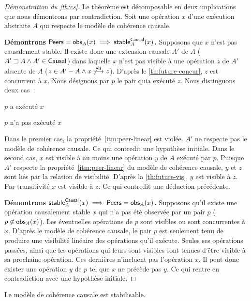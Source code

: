 \begin{proof}[Démonstration du \autoref{th:cs}]
Le théorème est décomposable en deux implications que nous démontrons par contradiction.
Soit une opération $x$ d'une exécution abstraite $A$ qui respecte le modèle de cohérence causale.

\textbf{Démontrons $\operatorname{\mathsf{Peers}} = \operatorname{\mathsf{obs}}_A(x) \implies \operatorname{\mathsf{stable}}_A^{\operatorname{\mathsf{Causal}}}(x)$.}
Supposons que $x$ n'est pas causalement stable.
Il existe donc une extension causale $A'$ de $A$ ($A' \sqsupset A \land A' \in \operatorname{\mathsf{Causal}}$) dans laquelle $x$ n'est pas visible à une opération $z$ de $A'$ absente de $A$ ($z \in A' - A \land x \not\overset{\mathsf{vis}}{\longrightarrow} z$).
D'après le \autoref{th:future-concur}, $z$ est concurrent à $x$.
Nous désignons par $p$ le pair quia exécuté $z$.
Nous distinguons deux cas~: \begin{inlinelist}
    \item $p$ a exécuté $x$
    \item $p$ n'a pas exécuté $x$
\end{inlinelist}
Dans le premier cas, la propriété~\ref{itm:peer-linear} est violée.
$A'$ ne respecte pas le modèle de cohérence causale.
Ce qui contredit une hypothèse initiale.
Dans le second cas, $x$ est visible à au moins une opération $y$ de $A$ exécuté par $p$.
Puisque $A'$ respecte la propriété~\ref{itm:peer-linear} du modèle de cohérence causale, $y$ et $z$ sont liés par la relation de visibilité.
D'après la \autoref{th:future-vis}, $y$ est visible à $z$.
Par transitivité $x$ est visible à $z$.
Ce qui contredit une déduction précédente.

\textbf{Démontrons $\operatorname{\mathsf{stable}}_A^{\operatorname{\mathsf{Causal}}}(x) \implies \operatorname{\mathsf{Peers}} = \operatorname{\mathsf{obs}}_A(x)$.}
Supposons qu'il existe une opération causalement stable $x$ qui n'a pas été observée par un pair $p$ ($p \not\in \operatorname{\mathsf{obs}}_A(x)$).
Les éventuelles opérations de $p$ sont visibles ou sont concurrentes à $x$.
D'après le modèle de cohérence causale, le pair $p$ est seulement tenu de produire une visibilité linéaire des opérations qu'il exécute.
Seules ses opérations passées, ainsi que les opérations qui leurs sont visibles sont tenues d'être visible à sa prochaine opération.
Ces dernières n'incluent pas l'opération $x$.
Il peut donc exister une opération $y$ de $p$ tel que $x$ ne précède pas $y$.
Ce qui rentre en contradiction avec une hypothèse initiale.
\end{proof}


\begin{theorem}\label{th:stabilizable-causal}
Le modèle de cohérence causale est stabilisable.
\end{theorem}


